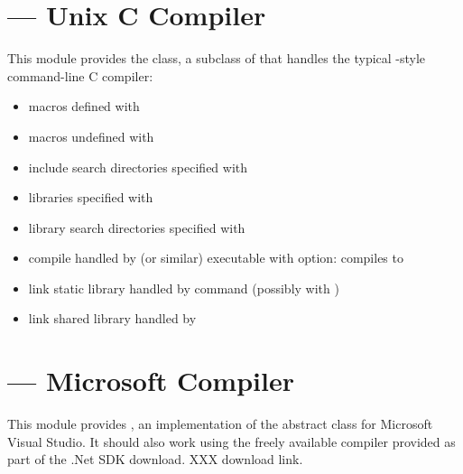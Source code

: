\documentclass{manual}
\begin{document}
%

\section{ --- Unix C Compiler}

This module provides the  class, a subclass of 
 that handles the typical \UNIX-style command-line 
C compiler:

\begin{itemize}
\item macros defined with 
\item macros undefined with 
\item include search directories specified with
\item libraries specified with 
\item library search directories specified with 
\item compile handled by  (or similar) executable with
       option: compiles  to 
\item link static library handled by  command (possibly
      with )
\item link shared library handled by  
\end{itemize}

\section{ --- Microsoft Compiler}

This module provides , an implementation of the abstract 
 class for Microsoft Visual Studio. It should also work using
the freely available compiler provided as part of the .Net SDK download. XXX
download link.
\end{document}
